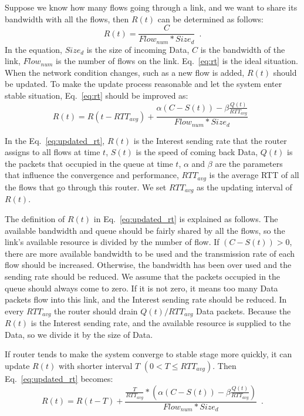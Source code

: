 Suppose we know how many flows going through a link, and we want to share its bandwidth with all the flows, then $R(t)$ can be determined as follows:
\begin{equation}
	\label{eq:rt}
	R(t)=\frac{C}{Flow_{num}*Size_{d}} \enspace .
\end{equation}
In the equation, $Size_{d}$ is the size of incoming Data, $C$ is the bandwidth of the link, $Flow_{num}$ is the number of flows on the link. Eq.~\ref{eq:rt} is the ideal situation. When the network condition changes, such as a new flow is added, $R(t)$ should be updated. To make the update process reasonable and let the system enter stable situation, Eq.~\ref{eq:rt} should be improved as:
\begin{equation}
	\label{eq:updated_rt}
	R(t)=R(t-RTT_{avg})+\frac{\alpha(C-S(t))-\beta\frac{Q(t)}{RTT_{avg}}}{Flow_{num}*Size_{d}} \enspace
\end{equation}

In the Eq.~\ref{eq:updated_rt}, $R(t)$ is the Interest sending rate that the router assigns to all flows at time $t$, $S(t)$ is the speed of coming back Data, $Q(t)$ is the packets that occupied in the queue at time $t$, $\alpha$ and $\beta$ are the parameters that influence the convergence and performance, $RTT_{avg}$ is the average RTT of all the flows that go through this router. We set $RTT_{avg}$ as the updating interval of $R(t)$.

The definition of $R(t)$ in Eq.~\ref{eq:updated_rt} is explained as follows. The available bandwidth and queue should be fairly shared by all the flows, so the link's available resource is divided by the number of flow. If $(C-S(t))>0$, there are more available bandwidth to be used and the transmission rate of each flow should be increased. Otherwise, the bandwidth has been over used and the sending rate should be reduced. We assume that the packets occupied in the queue should always come to zero. If it is not zero, it means too many Data packets flow into this link, and the Interest sending rate should be reduced. In every $RTT_{avg}$ the router should drain $Q(t)/RTT_{avg}$ Data packets. Because the $R(t)$ is the Interest sending rate, and the available resource is supplied to the Data, so we divide it by the size of Data.

If router tends to make the system converge to stable stage more quickly, it can update $R(t)$ with shorter interval $T$ $(0 < T \leq RTT_{avg})$. Then Eq.~\ref{eq:updated_rt} becomes:
\begin{equation}
	\label{eq:updated_rt3}
	R(t)=R(t-T)+\frac{\frac{T}{RTT_{avg}}\ast(\alpha(C-S(t))-\beta\frac{Q(t)}{RTT_{avg}})}{Flow_{num}*Size_{d}} \enspace .
\end{equation}

